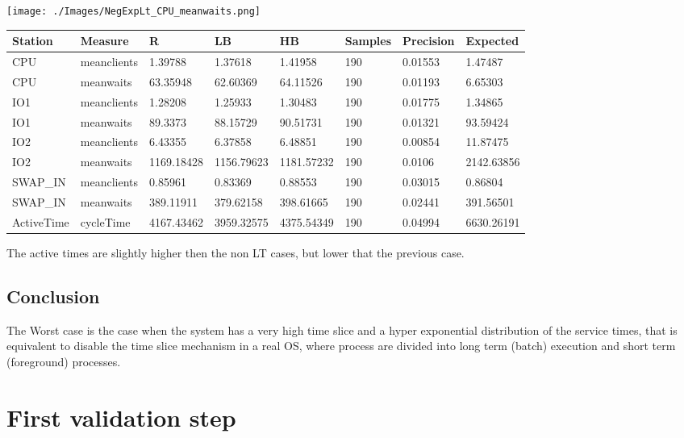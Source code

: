 \documentclass[12pt,a4paper]{article}
\begin{document}
\texttt{[image: ./Images/NegExpLt\_CPU\_meanwaits.png]}


\begin{table}[!ht]
    \centering
    \begin{tabular}{|l|l|l|l|l|l|l|l|}
    \hline
        Station & Measure & R & LB & HB & Samples & Precision & Expected \\ \hline
        CPU & meanclients & 1.39788 & 1.37618 & 1.41958 & 190 & 0.01553 & 1.47487 \\ \hline
        CPU & meanwaits & 63.35948 & 62.60369 & 64.11526 & 190 & 0.01193 & 6.65303 \\ \hline
        IO1 & meanclients & 1.28208 & 1.25933 & 1.30483 & 190 & 0.01775 & 1.34865 \\ \hline
        IO1 & meanwaits & 89.3373 & 88.15729 & 90.51731 & 190 & 0.01321 & 93.59424 \\ \hline
        IO2 & meanclients & 6.43355 & 6.37858 & 6.48851 & 190 & 0.00854 & 11.87475 \\ \hline
        IO2 & meanwaits & 1169.18428 & 1156.79623 & 1181.57232 & 190 & 0.0106 & 2142.63856 \\ \hline
        SWAP\_IN & meanclients & 0.85961 & 0.83369 & 0.88553 & 190 & 0.03015 & 0.86804 \\ \hline
        SWAP\_IN & meanwaits & 389.11911 & 379.62158 & 398.61665 & 190 & 0.02441 & 391.56501 \\ \hline
        ActiveTime & cycleTime & 4167.43462 & 3959.32575 & 4375.54349 & 190 & 0.04994 & 6630.26191 \\ \hline
    \end{tabular}
\end{table}

The active times are slightly higher then the non LT cases, but lower that the previous case.

\subsection{Conclusion}
The Worst case is the case when the system has a very high time slice and a hyper exponential distribution of the service times, that is equivalent to disable the time slice mechanism in a real OS, where process are divided into long term (batch) execution and short term (foreground) processes. 

\section{First validation step}
\end{document}
